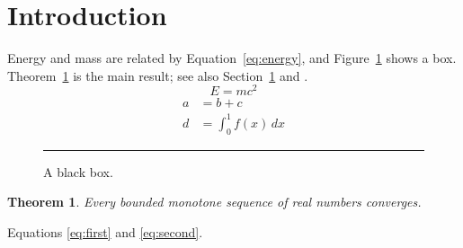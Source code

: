 \documentclass{article}
\newtheorem{theorem}{Theorem}
\begin{document}
\section{Introduction}
\label{sec:intro}
Energy and mass are related by Equation~\eqref{eq:energy}, and Figure~\ref{fig:box} shows a box.
Theorem~\ref{thm:main} is the main result; see also Section~\ref{sec:intro} and \cite{einstein1905}.
\begin{equation}
  E = mc^2 \label{eq:energy}
\end{equation}
\begin{align}
  a &= b + c \label{eq:first}\\
  d &= \int_0^1 f(x)\,dx \label{eq:second}
\end{align}
\begin{figure}[h]
  \centering
  \rule{4cm}{2cm}
  \caption{A black box.}
  \label{fig:box}
\end{figure}
\begin{theorem}\label{thm:main}
Every bounded monotone sequence of real numbers converges.
\end{theorem}
Equations \eqref{eq:first} and \eqref{eq:second}.


\end{document}
